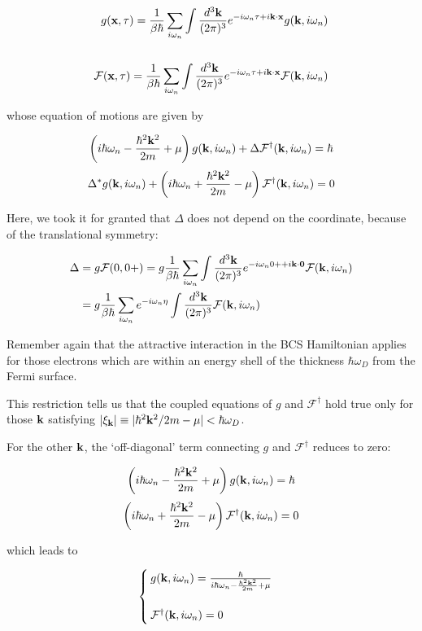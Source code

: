 \[\begin{split}
g({\bf x},\tau) = \frac{1}{\beta\hbar}\sum_{i\omega_n}\int\frac{d^3\bf k}{(2\pi)^3}e^{-i\omega_n\tau+i\bf k\cdot x}g({\bf k},i\omega_n)\\
\ \\
\mathcal{F}({\bf x},\tau) = \frac{1}{\beta\hbar}\sum_{i\omega_n}\int\frac{d^3\bf k}{(2\pi)^3}e^{-i\omega_n\tau+i\bf k\cdot x}\mathcal{F}({\bf k},i\omega_n)\\
\end{split}\]

whose equation of motions are given by

\[\left(i\hbar\omega_n-\frac{\hbar^2{\bf k}^2}{2m}+\mu\right)g({\bf k},i\omega_n)+\Delta\mathcal{F}^\dagger({\bf k},i\omega_n)=\hbar\]
\[\Delta^*g({\bf k},i\omega_n)+\left(i\hbar\omega_n+\frac{\hbar^2{\bf k}^2}{2m}-\mu\right)\mathcal{F}^\dagger({\bf k},i\omega_n)=0\]

Here, we took it for granted that $\Delta$ does not depend on the coordinate, because of the translational symmetry:

\[\begin{split}
\Delta&=g\mathcal{F}(0,0+)=g\frac{1}{\beta\hbar}\sum_{i\omega_n}\int\frac{d^3\bf k}{(2\pi)^3}e^{-i\omega_n0++i\bf k\cdot 0}\mathcal{F}({\bf k},i\omega_n)\\
&=g\frac{1}{\beta\hbar}\sum_{i\omega_n} e^{-i\omega_n\eta}\int\frac{d^3\bf k}{(2\pi)^3}\mathcal{F}({\bf k},i\omega_n)
\end{split}\]

Remember again that the attractive interaction in the BCS Hamiltonian applies for those electrons which are within an energy shell of the thickness $\hbar\omega_D$ from the Fermi surface. 

This restriction tells us that the coupled equations of $g$ and $\mathcal{F}^\dagger$ hold true only for those $\bf k$ satisfying $|\xi_{\bf k}|\equiv|\hbar^2{\bf k}^2/2m - \mu|<\hbar\omega_D$. 

For the other ${\bf k}$, the `off-diagonal' term connecting $g$ and $\mathcal{F}^\dagger$ reduces to zero:

\[\left(i\hbar\omega_n-\frac{\hbar^2{\bf k}^2}{2m}+\mu\right)g({\bf k},i\omega_n)=\hbar\]
\[\left(i\hbar\omega_n+\frac{\hbar^2{\bf k}^2}{2m}-\mu\right)\mathcal{F}^\dagger({\bf k},i\omega_n)=0\]

which leads to

\[\begin{cases}
g({\bf k},i\omega_n)=\frac{\hbar}{i\hbar\omega_n-\frac{\hbar^2{\bf k}^2}{2m}+\mu}\\
\ \\
\mathcal{F}^\dagger({\bf k},i\omega_n) = 0
\end{cases}\]

